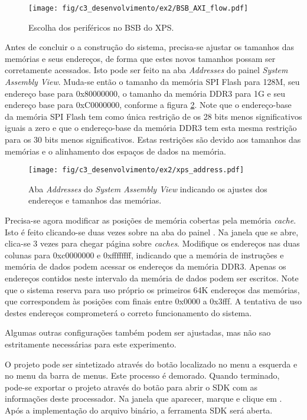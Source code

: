 \documentclass[11pt,a4paper,oneside]{book}
\begin{document}
\begin{figure}[htp]
\centering
\texttt{[image: fig/c3\_desenvolvimento/ex2/BSB\_AXI\_flow.pdf]}
\caption{Escolha dos periféricos no BSB do XPS.}
\label{fig:ex2:bsb_prerifericos}
\end{figure}

Antes de concluir o a construção do sistema, precisa-se ajustar os tamanhos das memórias e seus endereços, de forma que estes novos tamanhos possam ser corretamente acessados.
Isto pode ser feito na aba \textit{Addresses} do painel \textit{System Assembly View}.
Muda-se então o tamanho da memória SPI Flash para 128M, seu endereço base para 0x80000000, o tamanho da memória DDR3 para 1G e seu endereço base para 0xC0000000, conforme a figura \ref{fig:ex2:xps_enderecos}.
Note que o endereço-base da memória SPI Flash tem como única restrição de os 28 bits menos significativos iguais a zero e que o endereço-base da memória DDR3 tem esta mesma restrição para os 30 bits menos significativos.
Estas restrições são devido aos tamanhos das memórias e o alinhamento dos espaços de dados na memória.

\begin{figure}[htp]
\centering
\texttt{[image: fig/c3\_desenvolvimento/ex2/xps\_address.pdf]}
\caption{Aba \textit{Addresses} do \textit{System Assembly View} indicando os ajustes dos endereços e tamanhos das memórias.}
\label{fig:ex2:xps_enderecos}
\end{figure}

Precisa-se agora modificar as posições de memória cobertas pela memória \textit{cache}.
Isto é feito clicando-se duas vezes sobre  na aba  do painel .
Na janela que se abre, clica-se   3 vezes para chegar página sobre \textit{caches}.
Modifique os endereços nas duas colunas para 0xc0000000 e 0xffffffff, indicando que a memória de instruções e memória de dados podem acessar os endereços da memória DDR3.
Apenas os endereços contidos neste intervalo da memória de dados podem ser escritos.
Note que o sistema reserva para uso próprio os primeiros 64K endereços das memórias, que correspondem às posições com finais entre 0x0000 a 0x3fff.
A tentativa de uso destes endereços comprometerá o correto funcionamento do sistema.

Algumas outras configurações também podem ser ajustadas, mas não sao estritamente necessárias para este experimento.

O projeto pode ser sintetizado através do botão  localizado no menu a esquerda e no menu  da barra de menus.
Este processo é demorado.
Quando terminado, pode-se exportar o projeto através do botão  para abrir o SDK com as informações deste processador.
Na janela que aparecer, marque  e clique em .
Após a implementação do arquivo binário, a ferramenta SDK será aberta.
\end{document}
